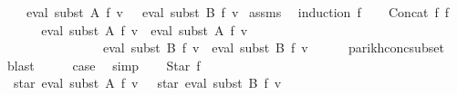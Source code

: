\begin{isabellebody}
\ \ \ {\isachardoublequoteopen}{\isasymPsi}\ {\isacharparenleft}{\kern0pt}eval\ {\isacharparenleft}{\kern0pt}subst\ A\ f{\isacharparenright}{\kern0pt}\ v{\isacharparenright}{\kern0pt}\ {\isasymsubseteq}\ {\isasymPsi}\ {\isacharparenleft}{\kern0pt}eval\ {\isacharparenleft}{\kern0pt}subst\ B\ f{\isacharparenright}{\kern0pt}\ v{\isacharparenright}{\kern0pt}{\isachardoublequoteclose}\isanewline
%
\isadelimproof
%
\endisadelimproof
%
\isatagproof
{}\isamarkupfalse%
\ assms\ \isamarkupfalse%
\ {\isacharparenleft}{\kern0pt}induction\ f{\isacharparenright}{\kern0pt}\isanewline
\ \ \isamarkupfalse%
\ {\isacharparenleft}{\kern0pt}Concat\ f{}\ f{}{\isacharparenright}{\kern0pt}\isanewline
\ \ \isamarkupfalse%
\ \isamarkupfalse%
\ {\isachardoublequoteopen}{\isasymPsi}\ {\isacharparenleft}{\kern0pt}eval\ {\isacharparenleft}{\kern0pt}subst\ A\ f{}{\isacharparenright}{\kern0pt}\ v\ {\isacharat}{\kern0pt}{\isacharat}{\kern0pt}\ eval\ {\isacharparenleft}{\kern0pt}subst\ A\ f{}{\isacharparenright}{\kern0pt}\ v{\isacharparenright}{\kern0pt}\isanewline
\ \ \ \ \ \ \ \ \ \ \ \ \ \ {\isasymsubseteq}\ {\isasymPsi}\ {\isacharparenleft}{\kern0pt}eval\ {\isacharparenleft}{\kern0pt}subst\ B\ f{}{\isacharparenright}{\kern0pt}\ v\ {\isacharat}{\kern0pt}{\isacharat}{\kern0pt}\ eval\ {\isacharparenleft}{\kern0pt}subst\ B\ f{}{\isacharparenright}{\kern0pt}\ v{\isacharparenright}{\kern0pt}{\isachardoublequoteclose}\isanewline
\ \ \ \ \isamarkupfalse%
\ parikh{\isacharunderscore}{\kern0pt}conc{\isacharunderscore}{\kern0pt}subset\ \isamarkupfalse%
\ blast\isanewline
\ \ \isamarkupfalse%
\ \isamarkupfalse%
\ {\isacharquery}{\kern0pt}case\ \isamarkupfalse%
\ simp\isanewline
{}\isamarkupfalse%
\isanewline
\ \ \isamarkupfalse%
\ {\isacharparenleft}{\kern0pt}Star\ f{\isacharparenright}{\kern0pt}\isanewline
\ \ \isamarkupfalse%
\ \isamarkupfalse%
\ {\isachardoublequoteopen}{\isasymPsi}\ {\isacharparenleft}{\kern0pt}star\ {\isacharparenleft}{\kern0pt}eval\ {\isacharparenleft}{\kern0pt}subst\ A\ f{\isacharparenright}{\kern0pt}\ v{\isacharparenright}{\kern0pt}{\isacharparenright}{\kern0pt}\ {\isasymsubseteq}\ {\isasymPsi}\ {\isacharparenleft}{\kern0pt}star\ {\isacharparenleft}{\kern0pt}eval\ {\isacharparenleft}{\kern0pt}subst\ B\ f{\isacharparenright}{\kern0pt}\ v{\isacharparenright}{\kern0pt}{\isacharparenright}{\kern0pt}{\isachardoublequoteclose}\isanewline

\end{isabellebody}
